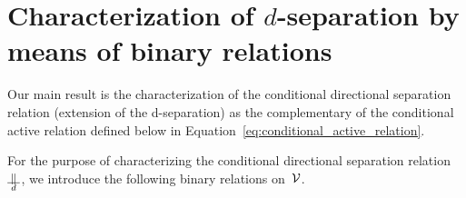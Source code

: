 \documentclass[12pt]{article}
\begin{document}
{{{\section{Characterization  of $d$-separation by means of binary relations}
\label{Characterization__of_the_conditional_directional_separation_binary_relation}

Our main result is the characterization of the conditional directional
separation relation (extension of the d-separation)
as the complementary of the conditional active relation defined below in
Equation~\eqref{eq:conditional_active_relation}.

For the purpose of characterizing the conditional directional separation relation~\(
\ConditionalDirectionalSeparation \), we introduce the following binary relations on~${\cal V}$.

}}}
\end{document}
